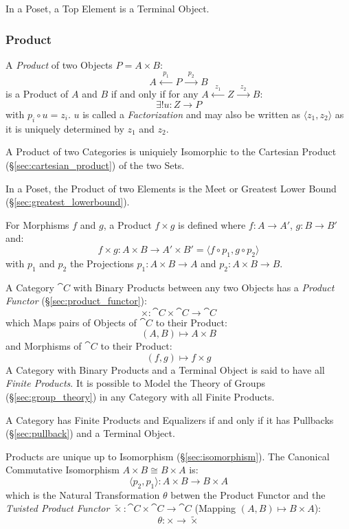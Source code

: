 In a Poset, a Top Element is a Terminal Object.



\subsubsection{Product}\label{sec:product}

A \emph{Product} of two Objects $P = A \times B$:
\[
  A \xleftarrow{\;\;p_1\;\;} P \xrightarrow{\;\;p_2\;\;} B
\]
is a Product of $A$ and $B$ if and only if for any $A
\xleftarrow{\;\;z_1\;\;} Z \xrightarrow{\;\;z_2\;\;} B$:
\[
  \exists!u : Z \rightarrow P
\]
with $p_i \circ u = z_i$. $u$ is called a \emph{Factorization} and may
also be written as $\langle z_1, z_2 \rangle$ as it is uniquely
determined by $z_1$ and $z_2$.

A Product of two Categories is uniquiely Isomorphic to the Cartesian
Product (\S\ref{sec:cartesian_product}) of the two Sets.

In a Poset, the Product of two Elements is the Meet or Greatest Lower
Bound (\S\ref{sec:greatest_lowerbound}).

For Morphisms $f$ and $g$, a Product $f \times g$ is defined where $f
: A \rightarrow A'$, $g : B \rightarrow B'$ and:
\[
  f \times g : A \times B \rightarrow A' \times B' =
  \langle f \circ p_1, g \circ p_2 \rangle
\]
with $p_1$ and $p_2$ the Projections $p_1 : A \times B \rightarrow A$
and $p_2 : A \times B \rightarrow B$.

A Category $\cat{C}$ with Binary Products between any two Objects
has a \emph{Product Functor} (\S\ref{sec:product_functor}):
\[
  \times : \cat{C} \times \cat{C} \rightarrow \cat{C}
\]
which Maps pairs of Objects of $\cat{C}$ to their Product:
\[
  (A,B) \mapsto A \times B
\]
and Morphisms of $\cat{C}$ to their Product:
\[
  (f,g) \mapsto f \times g
\]
A Category with Binary Products and a Terminal Object is said to have
all \emph{Finite Products}. It is possible to Model the Theory of
Groups (\S\ref{sec:group_theory}) in any Category with all Finite
Products.

A Category has Finite Products and Equalizers if and only if it has
Pullbacks (\S\ref{sec:pullback}) and a Terminal Object. \cite{awodey06}

Products are unique up to Isomorphism (\S\ref{sec:isomorphism}). The
Canonical Commutative Isomorphism $A \times B \cong B \times A$ is:
\[
  \langle p_2, p_1 \rangle : A \times B \rightarrow B \times A
\]
which is the Natural Transformation $\theta$ betwen the Product
Functor and the \emph{Twisted Product Functor} $\tilde{\times} :
\cat{C} \times \cat{C} \rightarrow \cat{C}$ (Mapping $(A,B)
\mapsto B \times A$):
\[
  \theta : \times \rightarrow \tilde{\times}
\]

